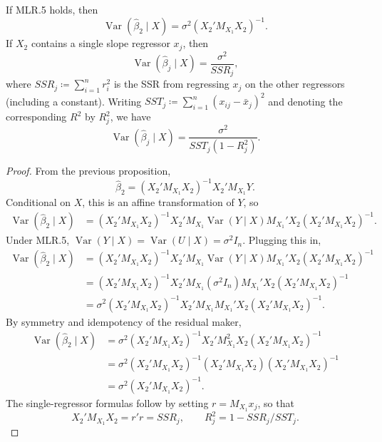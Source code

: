 \begin{proposition}
	If MLR.5 holds, then
	\[
		\operatorname{Var}(\hat{\beta}_2\mid X) = \sigma^2 (X_2' M_{X_1} X_2)^{-1}.
	\]
	If $X_2$ contains a single slope regressor $x_j$, then
	\[
		\operatorname{Var}(\hat{\beta}_j\mid X)=\frac{\sigma^2}{SSR_j},
	\]
	where $SSR_j \coloneqq \sum_{i=1}^n r_i^2$ is the SSR from regressing $x_j$ on the other regressors (including a constant).
	Writing $SST_j\coloneqq\sum_{i=1}^n (x_{ij}-\bar{x}_j)^2$ and denoting the corresponding $R^2$ by $R_j^2$, we have
	\[
		\operatorname{Var}(\hat{\beta}_j\mid X)=\frac{\sigma^2}{SST_j(1-R_j^2)}.
	\]
\end{proposition}
\begin{proof}
	From the previous proposition,
	\[
		\hat{\beta}_2 = (X_2'M_{X_1}X_2)^{-1}X_2'M_{X_1}Y.
	\]
	Conditional on $X$, this is an affine transformation of $Y$, so
	\begin{align*}
		\operatorname{Var}(\hat{\beta}_2\mid X)
		&= (X_2'M_{X_1}X_2)^{-1} X_2' M_{X_1} \operatorname{Var}(Y\mid X) M_{X_1}' X_2 (X_2'M_{X_1}X_2)^{-1}.
	\end{align*}
	Under MLR.5, $\operatorname{Var}(Y\mid X)=\operatorname{Var}(U\mid X)=\sigma^2 I_n$. Plugging this in,
	\begin{align*}
		\operatorname{Var}(\hat{\beta}_2\mid X)
		&= \left( X_2'M_{X_1}X_2 \right)^{-1} X_2' M_{X_1} \operatorname{Var}(Y\mid X) M_{X_1}' X_2 \left( X_2'M_{X_1}X_2 \right)^{-1} \\
		&= \left( X_2'M_{X_1}X_2 \right)^{-1} X_2' M_{X_1} \left( \sigma^2 I_n \right) M_{X_1}' X_2 \left( X_2'M_{X_1}X_2 \right)^{-1} \\
		&= \sigma^2 \left( X_2'M_{X_1}X_2 \right)^{-1} X_2' M_{X_1} M_{X_1}' X_2 \left( X_2'M_{X_1}X_2 \right)^{-1}
	.\end{align*}
	By symmetry and idempotency of the residual maker,
	\begin{align*}
		\operatorname{Var}(\hat{\beta}_2\mid X)
		&= \sigma^2 \left( X_2'M_{X_1}X_2 \right)^{-1} X_2' M_{X_1}^2 X_2 \left( X_2'M_{X_1}X_2 \right)^{-1} \\
		&= \sigma^2 \left( X_2'M_{X_1}X_2 \right)^{-1} \left( X_2' M_{X_1} X_2 \right) \left( X_2'M_{X_1}X_2 \right)^{-1} \\
		&= \sigma^2 \left( X_2'M_{X_1}X_2 \right)^{-1}
	.\end{align*}
	The single-regressor formulas follow by setting $r=M_{X_1}x_j$, so that
	\[X_2'M_{X_1}X_2=r'r=SSR_j,\qquad R_j^2=1-SSR_j/SST_j.\]
\end{proof}

